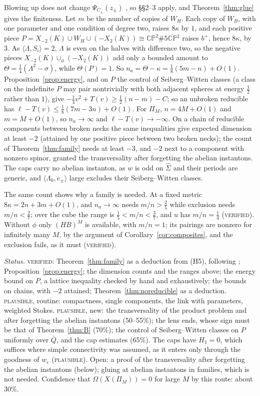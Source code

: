 \documentclass[10pt]{amsart}
\makeatletter
\numberwithin{equation}{section}
\theoremstyle{compact}
\renewenvironment{proof}[1][\proofname]{\par\pushQED{\qed}\normalfont
  \topsep4\p@\relax\trivlist\item[\hskip\labelsep\itshape#1\@addpunct{.}]%
  \ignorespaces}{\popQED\endtrivlist\@endpefalse}
\newcommand{\CP}{\mathbb{CP}}
\newcommand{\CPb}{\overline{\mathbb{CP}}{}^2}
\newcommand{\hS}{\hat\Sigma}
\newcommand{\step}[1]{\par\noindent\textit{#1}\enspace}
\newcommand{\ver}{\textsc{verified}}
\newcommand{\pla}{\textsc{plausible}}
\makeatother
\begin{document}
\begin{proof}[Sketch]
Blowing up does not change $\Psi_{C_\pm}(z_\pm)$ \cite{FS1}, so \S\S2--3 apply,
and Theorem~\ref{thm:glue} gives the finiteness. Let $m$ be the number of copies
of $W_H$. Each copy of $W_B$, with one parameter and one condition of degree two,
raises $8\kappa$ by $1$, and each positive piece $P=X_{-2}(K)\cup W_H\cup(-X_2(K))
\cong\CP^2\#5\CPb$ raises $b^+$, hence $8\kappa$, by $3$. As
$\langle\Lambda,S_i\rangle=2$, $\Lambda$ is even on the halves with difference
two, so the negative pieces $X_{-2}(K)\cup_\phi(-X_2(K))$ add only a bounded
amount to $\Theta=\frac14(\Lambda^2-\sigma)$, while $\Theta(P)=1$. So
$n_a=\Theta-\kappa=\frac18(5m-n)+O(1)$. Proposition~\ref{prop:energy}, and on $P$
the control of Seiberg--Witten classes (a class on the indefinite $P$ may pair
nontrivially with both adjacent spheres at energy $\frac12$ rather than $1$),
give $-\frac14v^2+T(v)\ge\frac12(n-m)-C$; so an unbroken reducible has
$\ell-T(v)\le\frac18(7m-3n)+O(1)$. For $\Pi_M$, $n=4M+O(1)$ and $m=M+O(1)$, so
$n_a\to\infty$ and $\ell-T(v)\to-\infty$. On a chain of reducible components
between broken necks the same inequalities give expected dimension at least
$-2$ (attained by one positive piece between two broken necks); the count of
Theorem~\ref{thm:family} needs at least $-3$, and $-2$ next to a component with
nonzero spinor, granted the transversality after forgetting the abelian
instantons. The caps carry no abelian instanton, as $w$ is odd on $\hS$ and their
periods are generic, and $\langle\Lambda_0,e_\pm\rangle$ large excludes their
Seiberg--Witten classes.
\end{proof}

The same count shows why a family is needed. At a fixed metric
$8\kappa=2n+3m+O(1)$, and $n_a\to\infty$ needs $m/n>\frac25$ while exclusion
needs $m/n<\frac27$; over the cube the range is $\frac15<m/n<\frac37$, and $u$
has $m/n=\frac14$ (\ver). Without $\phi$ only $(HB)^M$ is available, with
$m/n=1$; its pairings are nonzero for infinitely many $M$, by the argument of
Corollary~\ref{cor:composites}, and the exclusion fails, as it must (\ver).

\step{Status.} \ver: Theorem~\ref{thm:family} as a deduction from (H5),
following \cite[\S3]{FL2b}; Proposition~\ref{prop:energy}; the dimension counts
and the ranges above; the energy bound on $P$, a lattice inequality checked by
hand and exhaustively; the bounds on chains, with $-2$ attained;
Theorem~\ref{thm:noreducible} as a deduction. \pla, routine: compactness,
single components, the link with parameters, weighted Stokes. \pla, new: the
transversality of the product problem and after forgetting the abelian
instantons (50--55\%); the lens ends, whose sign must be that of
Theorem~\ref{thm:B} (70\%); the control of Seiberg--Witten classes on $P$
uniformly over $\bar Q$, and the cap estimates (65\%). The caps have $H_1=0$,
which suffices where simple connectivity was assumed, as it enters only through
the goodness of $w_e$ \cite[Def.~3.20]{FL2b} (\pla). Open: a proof of the transversality after forgetting the
abelian instantons (below); gluing at abelian instantons in families, which is
not needed. Confidence that $\Omega(X(\Pi_M))=0$ for large $M$ by this route:
about 30\%.
\end{document}
